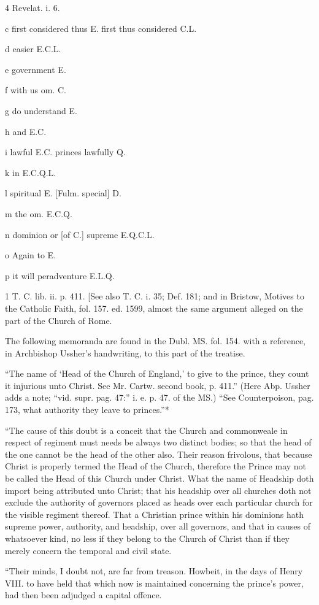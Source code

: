 4
Revelat. i. 6.

c
first considered thus E. first thus considered C.L.

d
easier E.C.L.

e
government E.

f
with us om. C.

g
do understand E.

h
and E.C.

i
lawful E.C. princes lawfully Q.

k
in E.C.Q.L.

l
spiritual E. [Fulm. special] D.

m
the om. E.C.Q.

n
dominion or [of C.] supreme E.Q.C.L.

o
Again to E.

p
it will peradventure E.L.Q.

1
T. C. lib. ii. p. 411. [See also T. C. i. 35; Def. 181; and in Bristow, Motives to the Catholic Faith, fol. 157. ed. 1599, almost the same argument alleged on the part of the Church of Rome.

The following memoranda are found in the Dubl. MS. fol. 154. with a reference, in Archbishop Ussher’s handwriting, to this part of the treatise.

“The name of ‘Head of the Church of England,’ to give to the prince, they count it injurious unto Christ. See Mr. Cartw. second book, p. 411.” (Here Abp. Ussher adds a note; “vid. supr. pag. 47:” i. e. p. 47. of the MS.) “See Counterpoison, pag. 173, what authority they leave to princes.”*

“The cause of this doubt is a conceit that the Church and commonweale in respect of regiment must needs be always two distinct bodies; so that the head of the one cannot be the head of the other also. Their reason frivolous, that because Christ is properly termed the Head of the Church, therefore the Prince may not be called the Head of this Church under Christ. What the name of Headship doth import being attributed unto Christ; that his headship over all churches doth not exclude the authority of governors placed as heads over each particular church for the visible regiment thereof. That a Christian prince within his dominions hath supreme power, authority, and headship, over all governors, and that in causes of whatsoever kind, no less if they belong to the Church of Christ than if they merely concern the temporal and civil state.

“Their minds, I doubt not, are far from treason. Howbeit, in the days of Henry VIII. to have held that which now is maintained concerning the prince’s power, had then been adjudged a capital offence.

